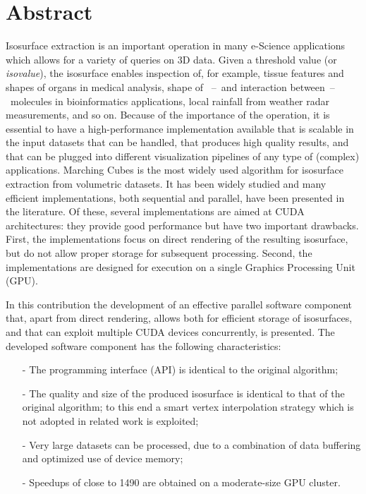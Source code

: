 \documentclass[article,A4,11pt]{llncs}%
\begin{document}
\section*{Abstract}
Isosurface extraction is an important operation in many e-Science applications which allows for a variety of queries on 3D data. Given a threshold value (or \emph{isovalue}), the isosurface enables inspection of, for example, tissue features and shapes of organs in medical analysis, shape of ~--~and interaction between~--~molecules in bioinformatics applications, local rainfall from weather radar measurements, and so on. Because of the importance of the operation, it is essential to have a high-performance implementation available that is scalable in the input datasets that can be handled, that produces high quality results, and that can be plugged into different visualization pipelines of any type of (complex) applications. Marching Cubes is the most widely used algorithm for isosurface extraction from volumetric datasets. It has been widely studied and many efficient implementations, both sequential and parallel, have been presented in the literature. Of these, several implementations are aimed at CUDA architectures: they provide good performance but have two important drawbacks. First, the implementations focus on direct rendering of the resulting isosurface, but do not allow proper storage for subsequent processing. Second, the implementations are designed for execution on a single Graphics Processing Unit (GPU). 

In this contribution the development of an effective parallel software component that, apart from direct rendering, allows both for efficient storage of isosurfaces, and that can exploit multiple CUDA devices concurrently, is presented. 
The developed software component has the following characteristics:
\begin{itemize}
\item[-] The programming interface (API) is identical to the original algorithm;
\item[-] The quality and size of the produced isosurface is identical to that of the original algorithm; to this end a smart vertex interpolation strategy which is not adopted in related work is exploited;
\item[-] Very large datasets can be processed, due to a combination of data buffering and optimized use of device memory;
\item[-] Speedups of close to 1490 are obtained on a moderate-size GPU cluster.
\end{itemize}
\end{document}

